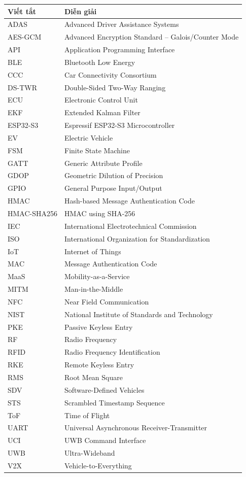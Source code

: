 \documentclass[a4paper,12pt,twoside]{report}
\begin{document}
\begin{longtable}{p{3cm} p{11cm}}
\textbf{Viết tắt} & \textbf{Diễn giải} \\
\hline
\endhead

ADAS & Advanced Driver Assistance Systems \\
AES-GCM & Advanced Encryption Standard – Galois/Counter Mode \\
API & Application Programming Interface \\
BLE & Bluetooth Low Energy \\
CCC & Car Connectivity Consortium \\
DS-TWR & Double-Sided Two-Way Ranging \\
ECU & Electronic Control Unit \\
EKF & Extended Kalman Filter \\
ESP32-S3 & Espressif ESP32-S3 Microcontroller \\
EV & Electric Vehicle \\
FSM & Finite State Machine \\
GATT & Generic Attribute Profile \\
GDOP & Geometric Dilution of Precision \\
GPIO & General Purpose Input/Output \\
HMAC & Hash-based Message Authentication Code \\
HMAC-SHA256 & HMAC using SHA-256 \\
IEC & International Electrotechnical Commission \\
ISO & International Organization for Standardization \\
IoT & Internet of Things \\
MAC & Message Authentication Code \\
MaaS & Mobility-as-a-Service \\
MITM & Man-in-the-Middle \\
NFC & Near Field Communication \\
NIST & National Institute of Standards and Technology \\
PKE & Passive Keyless Entry \\
RF & Radio Frequency \\
RFID & Radio Frequency Identification \\
RKE & Remote Keyless Entry \\
RMS & Root Mean Square \\
SDV & Software-Defined Vehicles \\
STS & Scrambled Timestamp Sequence \\
ToF & Time of Flight \\
UART & Universal Asynchronous Receiver-Transmitter \\
UCI & UWB Command Interface \\
UWB & Ultra-Wideband \\
V2X & Vehicle-to-Everything \\
\end{longtable}
\end{document}
